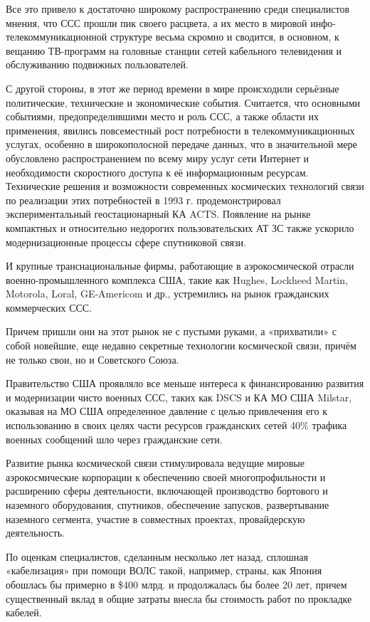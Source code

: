 \documentclass[14pt,a4paper,oneside]{extarticle}
\begin{document}
Все это привело к достаточно широкому распространению среди  специалистов мнения, что ССС прошли пик своего расцвета, а их место в мировой инфо-телекоммуникационной структуре весьма скромно и сводится, в основном, к  вещанию ТВ-программ на головные станции сетей кабельного телевидения и обслуживанию подвижных пользователей.

С другой стороны, в этот же период времени в мире происходили серьёзные политические, технические и экономические события.
Считается, что  основными событиями, предопределившими место и роль ССС, а также области их применения, явились повсеместный рост потребности в телекоммуникационных услугах, особенно в широкополосной передаче данных, что в значительной мере  обусловлено распространением по всему миру услуг сети Интернет и  необходимости скоростного доступа к её информационным ресурсам.
Технические решения и возможности современных космических технологий связи по реализации этих потребностей в 1993 г.  продемонстрировал экспериментальный геостационарный КА ACTS. Появление на рынке компактных и относительно недорогих пользовательских АТ ЗС также ускорило модернизационные процессы сфере спутниковой связи.

И крупные транснациональные фирмы, работающие в   аэрокосмической отрасли военно-промышленного комплекса США,  такие как Hughes, Lockheed Martin, Motorola, Loral, GE-Americom и др., устремились на рынок гражданских коммерческих ССС.

Причем пришли они на этот рынок не с пустыми руками, а  «прихватили» с собой новейшие, еще недавно секретные технологии космической связи, причём не только свои, но и Советского Союза.

Правительство США проявляло все меньше интереса к финансированию развития и модернизации чисто военных ССС, таких как DSCS и КА МО США Milstar, оказывая на МО США определенное давление с целью привлечения его к использованию в своих целях части ресурсов гражданских сетей 40\%  трафика военных сообщений шло через гражданские сети.

Развитие рынка космической связи стимулировала ведущие  мировые аэрокосмические корпорации к обеспечению своей многопрофильности и расширению сферы деятельности, включающей производство бортового и наземного оборудования, спутников, обеспечение запусков,  развертывание наземного сегмента, участие в совместных проектах, провайдерскую деятельность.

По оценкам специалистов, сделанным несколько лет назад, сплошная «кабелизация» при помощи ВОЛС такой, например, страны, как Япония обошлась бы примерно в \$400 млрд. и продолжалась бы более 20 лет, причем существенный вклад в общие затраты внесла бы стоимость работ по прокладке кабелей.
\end{document}
